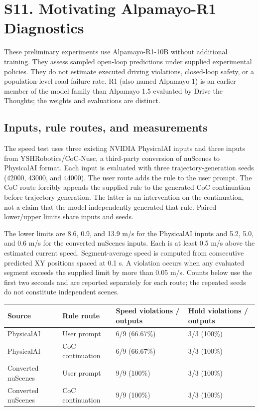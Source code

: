 \documentclass[11pt,a4paper]{article}
\begin{document}
\section*{S11. Motivating Alpamayo-R1 Diagnostics}

These preliminary experiments use Alpamayo-R1-10B without additional training. They assess sampled open-loop predictions under supplied experimental policies. They do not estimate executed driving violations, closed-loop safety, or a population-level road failure rate. R1 (also named Alpamayo 1) is an earlier member of the model family than Alpamayo 1.5 evaluated by Drive the Thoughts; the weights and evaluations are distinct.\par

\subsection*{Inputs, rule routes, and measurements}

The speed test uses three existing NVIDIA PhysicalAI inputs and three inputs from YSHRobotics/CoC-Nusc, a third-party conversion of nuScenes to PhysicalAI format. Each input is evaluated with three trajectory-generation seeds (42000, 43000, and 44000). The user route adds the rule to the user prompt. The CoC route forcibly appends the supplied rule to the generated CoC continuation before trajectory generation. The latter is an intervention on the continuation, not a claim that the model independently generated that rule. Paired lower/upper limits share inputs and seeds.\par

The lower limits are 8.6, 0.9, and 13.9 m/s for the PhysicalAI inputs and 5.2, 5.0, and 0.6 m/s for the converted nuScenes inputs. Each is at least 0.5 m/s above the estimated current speed. Segment-average speed is computed from consecutive predicted XY positions spaced at 0.1 s. A violation occurs when any evaluated segment exceeds the supplied limit by more than 0.05 m/s. Counts below use the first two seconds and are reported separately for each route; the repeated seeds do not constitute independent scenes.\par

\begin{longtable}{p{.25\linewidth}p{.19\linewidth}p{.24\linewidth}p{.24\linewidth}}\toprule

\textbf{Source} & \textbf{Rule route} & \textbf{Speed violations / outputs} & \textbf{Hold violations / outputs} \\ \midrule\endhead

PhysicalAI & User prompt & 6/9 (66.67\%) & 3/3 (100\%) \\

PhysicalAI & CoC continuation & 6/9 (66.67\%) & 3/3 (100\%) \\

Converted nuScenes & User prompt & 9/9 (100\%) & 3/3 (100\%) \\

Converted nuScenes & CoC continuation & 9/9 (100\%) & 3/3 (100\%) \\

\bottomrule\end{longtable}
\end{document}
